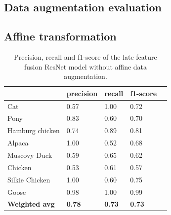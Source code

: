 \documentclass{l4proj}
\begin{document}
\begin{appendices}

\chapter{Data augmentation evaluation}
\label{appendix_augmentation}

\section{Affine transformation}
\label{appendix_augmentation_affine}

\begin{table}[H]
  \centering
  \begin{tabular}{@{}lllll@{}}
  \toprule
                        & \textbf{precision} & \textbf{recall} & \textbf{f1-score} &  \\ \midrule
  Cat                   & 0.57               & 1.00            & 0.72              &  \\
  Pony                  & 0.83               & 0.60            & 0.70              &  \\
  Hamburg chicken       & 0.74               & 0.89            & 0.81              &  \\
  Alpaca                & 1.00               & 0.52            & 0.68              &  \\
  Muscovy Duck          & 0.59               & 0.65            & 0.62              &  \\
  Chicken               & 0.53               & 0.61            & 0.57              &  \\
  Silkie Chicken        & 1.00               & 0.60            & 0.75              &  \\
  Goose                 & 0.98               & 1.00            & 0.99              &  \\
  \midrule
  \textbf{Weighted avg} & \textbf{0.78}      & \textbf{0.73}   & \textbf{0.73}     &  \\ \bottomrule
  \end{tabular}
  \caption{Precision, recall and f1-score of the late feature fusion ResNet model without affine data augmentation.}
  \label{table:appendix_affine_1}
\end{table}


\end{appendices}
\end{document}
